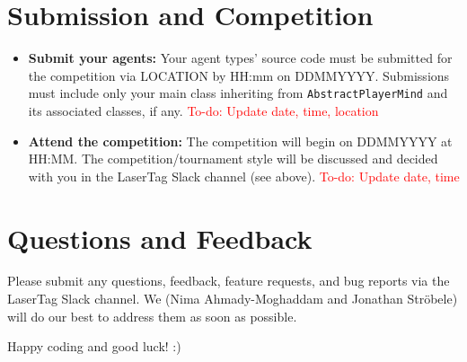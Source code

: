 \documentclass[
    a4paper,
    english,
    DIV=16,
    11pt,
    parskip=half,
]{scrartcl}
\newcommand\todo[1]{\textcolor{red}{#1}}
\begin{document}
\section*{Submission and Competition}

\begin{itemize}
  \item \textbf{Submit your agents:} Your agent types' source code must be submitted for the competition via LOCATION by HH:mm on DDMMYYYY. Submissions must include only your main class inheriting from \texttt{AbstractPlayerMind} and its associated classes, if any. \todo{To-do: Update date, time, location}
  \item \textbf{Attend the competition:} The competition will begin on DDMMYYYY at HH:MM. The competition/tournament style will be discussed and decided with you in the LaserTag Slack channel (see above). \todo{To-do: Update date, time}
\end{itemize}

\section*{Questions and Feedback}
Please submit any questions, feedback, feature requests, and bug reports via the LaserTag Slack channel. We (Nima Ahmady-Moghaddam and Jonathan Ströbele) will do our best to address them as soon as possible.

Happy coding and good luck! :)

\end{document}
